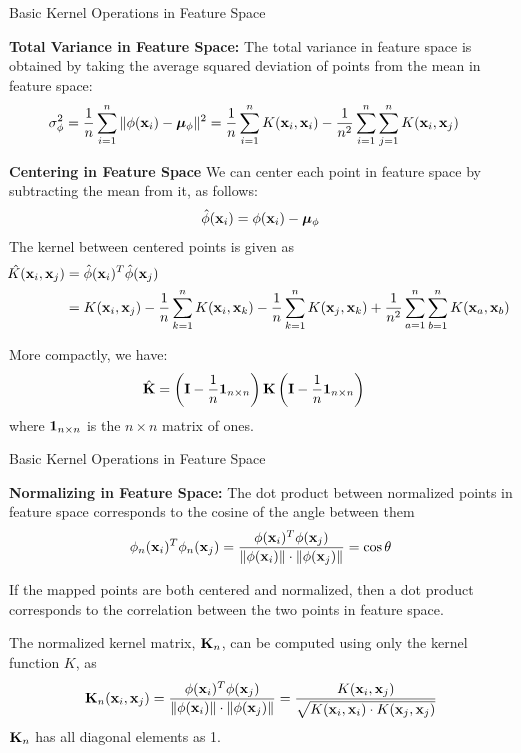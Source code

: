 \begin{frame}{Basic Kernel Operations in Feature Space}
\small

{\bf Total Variance in Feature Space:}
The total variance in feature space is
obtained by taking the average squared
deviation of points from the mean in feature space:
\begin{align*}
        \sigma_\phi^2 & = {1 \over n} \sum_{i=1}^n \|\phi(\mathbf{x}_i)
        - {\bm \mu}_\phi \|^2 = 
 {1 \over n} \sum_{i=1}^n K(\mathbf{x}_i, \mathbf{x}_i) - {1\over n^2}
 \sum_{i=1}^n \sum_{j=1}^n K(\mathbf{x}_i, \mathbf{x}_{j})
\end{align*}

\medskip
{\bf Centering in Feature Space}
We can center each point in feature space by subtracting the mean
from it, as follows:
\begin{align*}
  \hat{\phi}(\mathbf{x}_i) = \phi(\mathbf{x}_i) - {\bm \mu}_\phi
\end{align*}
The kernel between centered points is given as
\begin{align*}
  \hat{\kern-3pt K}(\mathbf{x}_i,\mathbf{x}_{j}) & = \hat{\phi}(\mathbf{x}_i)^T\hat{\phi}(\mathbf{x}_{j})\\
  & = K(\mathbf{x}_i,\mathbf{x}_{j}) - {1 \over n} \displaystyle \sum_{k=1}^n K(\mathbf{x}_i,\mathbf{x}_k)  -
  {1 \over n} \displaystyle \sum_{k=1}^n K(\mathbf{x}_{j},\mathbf{x}_k) + {1 \over n^2}
  \displaystyle \sum_{a=1}^n \displaystyle \sum_{b=1}^n K(\mathbf{x}_a,\mathbf{x}_b)
\end{align*}

More compactly, we have:
\begin{align*}
    \hat{\mathbf{K}} &= 
    \left(\mathbf{I} - {1\over n}\mathbf{1}_{n\times n}\right) \mathbf{K}
    \left(\mathbf{I} - {1\over n}\mathbf{1}_{n\times n}\right)
\end{align*}
where $\mathbf{1}_{n\times n}$ is the  $n \times n$ matrix of ones.
\end{frame}


\begin{frame}{Basic Kernel Operations in Feature Space}

{\bf Normalizing in Feature Space:}
The dot product between normalized points in feature space 
corresponds to the cosine of the angle between them
\begin{align*}
  \phi_n(\bx_i)^T\phi_n(\bx_{j}) =
  {\phi(\bx_i)^T\phi(\bx_{j}) \over \norm{\vphantom{\norm{\phi(\bx_{j})}}\phi(\bx_i)}
  \cdot \norm{\phi(\bx_{j})}} = \cos \theta
\end{align*}

\medskip
If the mapped points are both centered and normalized,
then a dot product corresponds to the correlation
between the two points in feature space.

\medskip
The normalized kernel matrix, $\mathbf{K}_n$,
can be computed using only the kernel function $K$, as
\begin{align*}
  \bK_n(\bx_i, \bx_{j}) = {\phi(\bx_i)^T\phi(\bx_{j}) \over \norm{\vphantom{\norm{\phi(\bx_{j})}}\phi(\bx_i)}
  \cdot \norm{\phi(\bx_{j})}} =
  {K(\bx_i, \bx_{j}) \over \sqrt{K(\bx_i,\bx_i) \cdot K(\bx_{j},\bx_{j})}}
\end{align*}
$\mathbf{K}_n$ has all diagonal elements as 1.
\end{frame}


